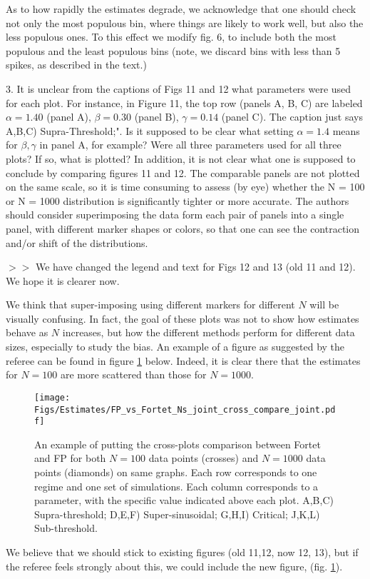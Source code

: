 \documentclass{article}
\begin{document}
As to how rapidly the estimates degrade, we acknowledge that one should check
not only the most populous bin, where things are likely to work well, but also
the less populous ones. To this effect we modify fig. 6, to include both  the
most populous and the least populous bins (note, we discard bins with less
than 5 spikes, as described in the text.)

\vskip 10pt

3. It is unclear from the captions of Figs 11 and 12 what parameters were used
for each plot. For instance, in Figure 11, the top row (panels A, B, C) are
labeled $\alpha = 1.40$ (panel A), $\beta = 0.30$ (panel B),
 $\gamma= 0.14$ (panel C). The caption just says A,B,C) Supra-Threshold;".
Is it supposed to be clear what setting $\alpha = 1.4$ means for $\beta,\gamma$ in panel A,
for example? Were all three parameters used for all three plots? If so, what is
plotted? In addition, it is not clear what one is supposed to conclude by
comparing figures 11 and 12. The comparable panels are not plotted on the same
scale, so it is time consuming to assess (by eye) whether the N = 100 or N =
1000 distribution is significantly tighter or more accurate. The authors should
consider superimposing the data form each pair of panels into a single panel,
with different marker shapes or colors, so that one can see the contraction
and/or shift of the distributions.

$>>$ We have changed the legend and text for Figs 12 and 13 (old 11 and 12). We
hope it is clearer now.

We think that super-imposing using different markers for different $N$ will be
visually confusing. In fact, the goal of these plots was not to show how
estimates behave as $N$ increases, but how the different methods perform for
different data sizes, especially to study the bias. An example of a figure as
suggested by the referee can be found in figure \ref{fig:FP_vs_Fortet_joint_Ns}
below. Indeed, it is clear there that the estimates for $N=100$ are
more scattered than those for $N=1000$.
\begin{figure}[htp]
\begin{center}
 \texttt{[image: Figs/Estimates/FP\_vs\_Fortet\_Ns\_joint\_cross\_compare\_joint.pdf]}
  \caption{
  An example of putting the cross-plots comparison between Fortet and FP for both $N=100$ data points (crosses) and $N=1000$ data points (diamonds) on same graphs.
  Each row corresponds to one regime and one set of simulations. Each column
  corresponds to a parameter, with the specific value indicated above each plot.
A,B,C) Supra-threshold; D,E,F) Super-sinusoidal; G,H,I) Critical; J,K,L) Sub-threshold.}
  \label{fig:FP_vs_Fortet_joint_Ns}
\end{center}
\end{figure}
We believe that we should stick to existing figures (old 11,12, now 12, 13), but
if the referee feels strongly about this, we could include the new figure,
(fig. \ref{fig:FP_vs_Fortet_joint_Ns}).
\end{document}
